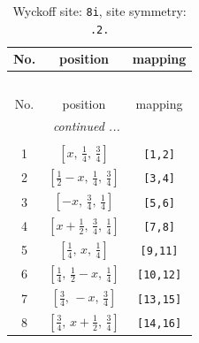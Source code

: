 \documentclass[fleqn,8pt]{jsarticle}
\begin{document}
\renewcommand{\arraystretch}{1.2}
\begin{longtable}{ccc}
\caption{Wyckoff site: {\tt 8i}, site symmetry: {\tt .2.}}
 \\
 \hline \hline
No. & position & mapping \\ \hline \endfirsthead

\multicolumn{2}{l}{\tablename\ \thetable{}} \\
 \hline \hline
No. & position & mapping \\ \hline \endhead

 \hline \hline
\multicolumn{2}{r}{\footnotesize\it continued ...} \\ \endfoot

 \hline \hline
\multicolumn{2}{r}{} \\ \endlastfoot

1 & $\left[ x,\, \frac{1}{4},\, \frac{3}{4} \right]$ & {\tt [1,2]} \\ \hline
2 & $\left[ \frac{1}{2} - x,\, \frac{1}{4},\, \frac{3}{4} \right]$ & {\tt [3,4]} \\ \hline
3 & $\left[ - x,\, \frac{3}{4},\, \frac{1}{4} \right]$ & {\tt [5,6]} \\ \hline
4 & $\left[ x + \frac{1}{2},\, \frac{3}{4},\, \frac{1}{4} \right]$ & {\tt [7,8]} \\ \hline
5 & $\left[ \frac{1}{4},\, x,\, \frac{1}{4} \right]$ & {\tt [9,11]} \\ \hline
6 & $\left[ \frac{1}{4},\, \frac{1}{2} - x,\, \frac{1}{4} \right]$ & {\tt [10,12]} \\ \hline
7 & $\left[ \frac{3}{4},\, - x,\, \frac{3}{4} \right]$ & {\tt [13,15]} \\ \hline
8 & $\left[ \frac{3}{4},\, x + \frac{1}{2},\, \frac{3}{4} \right]$ & {\tt [14,16]} \\
\end{longtable}
\renewcommand{\arraystretch}{1.2}
\end{document}
